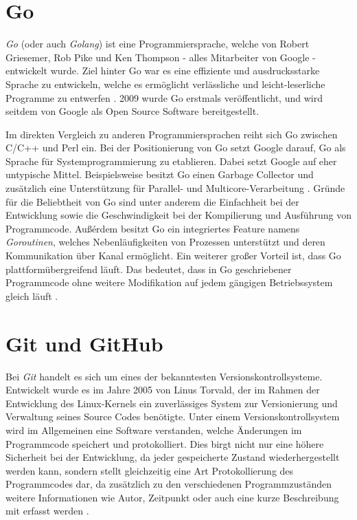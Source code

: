 \section{Go}
\textit{Go} (oder auch \textit{Golang}) ist eine Programmiersprache, welche von
Robert Griesemer, Rob Pike und Ken Thompson - alles Mitarbeiter von Google -
entwickelt wurde. Ziel hinter Go war es eine effiziente und ausdrucksstarke
Sprache zu entwickeln, welche es ermöglicht verlässliche und leicht-leserliche
Programme zu entwerfen \autocite{donovan_kernighan_2016}.
2009 wurde Go erstmals veröffentlicht, und wird seitdem von Google als Open Source
Software bereitgestellt. \newline

Im direkten Vergleich zu anderen Programmiersprachen reiht sich Go zwischen
C/C++ und Perl ein. Bei der Positionierung von Go setzt Google darauf, Go als
Sprache für Systemprogrammierung zu etablieren. Dabei setzt Google auf eher
untypische Mittel. Beispielsweise besitzt Go einen Garbage Collector und zusätzlich eine
Unterstützung für Parallel- und Multicore-Verarbeitung
\autocite{feike_blass_2012}. \newline 
Gründe für die Beliebtheit von Go sind unter anderem die Einfachheit bei der
Entwicklung sowie die Geschwindigkeit bei der Kompilierung und
Ausführung von Programmcode. Außérdem besitzt Go ein integriertes Feature namens
\textit{Goroutinen}, welches Nebenläufigkeiten von Prozessen unterstützt und
deren Kommunikation über Kanal ermöglicht. 
Ein weiterer großer Vorteil ist, dass Go plattformübergreifend läuft. Das bedeutet,
dass in Go geschriebener Programmcode ohne weitere Modifikation auf jedem
gängigen Betriebssystem gleich läuft \autocite{donovan_kernighan_2016}.


\section{Git und GitHub}
Bei \textit{Git} handelt es sich um eines der bekanntesten
Versionskontrollsysteme. Entwickelt wurde es im Jahre 2005 von Linus Torvald,
der im Rahmen der Entwicklung des Linux-Kernels ein zuverlässiges System zur
Versionierung und Verwaltung seines Source Codes benötigte. Unter einem
Versionskontrollsystem wird im Allgemeinen eine Software verstanden, welche
Änderungen im Programmcode speichert und protokolliert. Dies birgt nicht nur
eine höhere Sicherheit bei der Entwicklung, da jeder gespeicherte Zustand
wiederhergestellt werden kann, sondern stellt gleichzeitig eine Art
Protokollierung des Programmcodes dar, da zusätzlich zu den verschiedenen
Programmzuständen weitere Informationen wie Autor, Zeitpunkt oder auch eine
kurze Beschreibung mit erfasst werden \autocite{preissel_stachmann_2017}. \hfill
\break 

